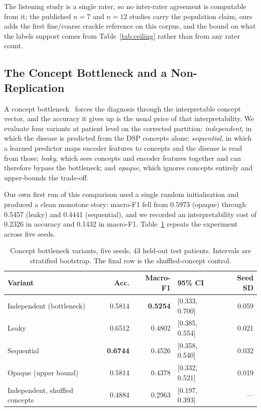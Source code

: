 \documentclass[journal,onecolumn]{IEEEtran}
\newcommand{\best}[1]{\textbf{#1}}
\begin{document}
The listening study is a single rater, so no inter-rater agreement is computable from
it; the published $n=7$ and $n=12$ studies carry the population claim, ours adds the
first fine/coarse crackle reference on this corpus, and the bound on what the labels
support comes from Table~\ref{tab:ceiling} rather than from any rater count.

\subsection{The Concept Bottleneck and a Non-Replication}
\label{subsec:bottleneck}

A concept bottleneck~\cite{koh2020cbm} forces the diagnosis through the interpretable
concept vector, and the accuracy it gives up is the usual price of that
interpretability. We evaluate four variants at patient level on the corrected
partition: \emph{independent}, in which the disease is predicted from the DSP concepts
alone; \emph{sequential}, in which a learned predictor maps encoder features to
concepts and the disease is read from those; \emph{leaky}, which sees concepts and
encoder features together and can therefore bypass the bottleneck; and \emph{opaque},
which ignores concepts entirely and upper-bounds the trade-off.

Our own first run of this comparison used a single random initialisation and produced a
clean monotone story: macro-F1 fell from 0.5973 (opaque) through 0.5457 (leaky) and
0.4441 (sequential), and we recorded an interpretability cost of 0.2326 in accuracy and
0.1432 in macro-F1. Table~\ref{tab:bottleneck} repeats the experiment across five
seeds.

\begin{table}[!t]
\centering
\caption{Concept bottleneck variants, five seeds, 43 held-out test patients.
Intervals are stratified bootstrap. The final row is the shuffled-concept control.}
\label{tab:bottleneck}
\begin{tabular}{lrrlr}
\toprule
Variant & Acc. & Macro-F1 & 95\% CI & Seed SD \\
\midrule
Independent (bottleneck) & 0.5814 & \best{0.5254} & [0.333, 0.700] & 0.059 \\
Leaky                    & 0.6512 & 0.4802 & [0.385, 0.554] & 0.021 \\
Sequential               & \best{0.6744} & 0.4526 & [0.358, 0.540] & 0.032 \\
Opaque (upper bound)     & 0.5814 & 0.4378 & [0.332, 0.521] & 0.019 \\
\midrule
Independent, shuffled concepts & 0.4884 & 0.2963 & [0.197, 0.393] & --- \\
\bottomrule
\end{tabular}
\end{table}
\end{document}

